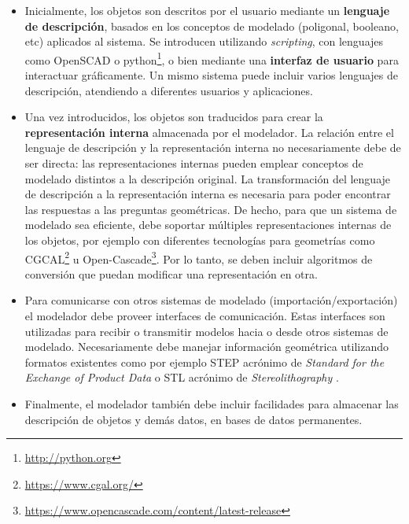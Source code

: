 \begin{itemize}
\item Inicialmente, 
los objetos son descritos por el usuario mediante un \textbf{lenguaje de descripción}, basados en los conceptos de modelado (poligonal, booleano, etc) aplicados al sistema. 
Se introducen utilizando \textit{scripting}, con lenguajes como OpenSCAD o \Gls{python}\footnote{\url{http://python.org}}, o bien mediante una \textbf{interfaz de usuario} para interactuar gráficamente. Un mismo sistema puede incluir varios lenguajes de descripción, atendiendo a diferentes usuarios y aplicaciones.

\item Una vez introducidos, los objetos son traducidos para crear la \textbf{representación interna} almacenada por el modelador. 
La relación entre el lenguaje de descripción y la representación interna no necesariamente debe de ser directa: las representaciones internas pueden emplear conceptos de modelado distintos a la descripción original. La transformación del lenguaje de descripción a la representación interna es necesaria para poder encontrar las respuestas a las preguntas geométricas. De hecho, para que un sistema de modelado sea eficiente, debe soportar múltiples representaciones internas de los objetos, por ejemplo con diferentes tecnologías para geometrías como \Gls{CGCAL}\footnote{\url{https://www.cgal.org/}} u \Gls{Open-Cascade}\footnote{\url{https://www.opencascade.com/content/latest-release}}. Por lo tanto, se deben incluir algoritmos de conversión que puedan modificar una representación en otra.

 \item Para comunicarse con otros sistemas de modelado  (importación/exportación) el modelador debe proveer interfaces de comunicación. 
 Estas interfaces son utilizadas para recibir o transmitir modelos hacia o desde otros sistemas de modelado. Necesariamente debe manejar información geométrica utilizando formatos existentes como por ejemplo \Gls{STEP} acrónimo de \textit{Standard for the Exchange of Product Data} \citep{Wilson1998} o \Gls{STL} acrónimo  de \textit{Stereolithography} \citep{grimm2004user}.

\item Finalmente, el modelador también debe incluir facilidades para almacenar las descripción de objetos y demás datos, en bases de datos permanentes. 
\end{itemize}

